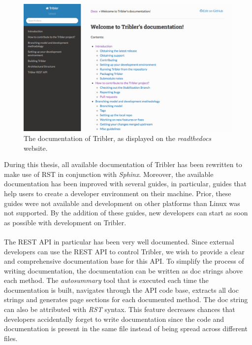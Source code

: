 \begin{figure}[h!]
	\centering
	\includegraphics[width=1.0\columnwidth]{images/improving_qa/readthedocs}
	\caption{The documentation of Tribler, as displayed on the \emph{readthedocs} website.}
	\label{fig:old-threading-model}
\end{figure}

During this thesis, all available documentation of Tribler has been rewritten to make use of RST in conjunction with \emph{Sphinx}. Moreover, the available documentation has been improved with several guides, in particular, guides that help users to create a developer environment on their machine. Prior, these guides were not available and development on other platforms than Linux was not supported. By the addition of these guides, new developers can start as soon as possible with development on Tribler.\\\\
The REST API in particular has been very well documented. Since external developers can use the REST API to control Tribler, we wish to provide a clear and comprehensive documentation base for this API. To simplify the process of writing documentation, the documentation can be written as doc strings above each method. The \emph{autosummary} tool that is executed each time the documentation is built, navigates through the API code base, extracts all doc strings and generates page sections for each documented method. The doc string can also be attributed with \emph{RST} syntax. This feature decreases chances that developers accidentally forget to write documentation since the code and documentation is present in the same file instead of being spread across different files.

